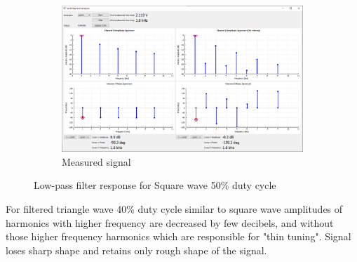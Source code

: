 \documentclass[notitlepage, a4paper, 11pt]{article}
\begin{document}
\begin{figure}[H]
\begin{subfigure}[][][t]{0.45\textwidth}
			\includegraphics[width=\textwidth, trim=10 80 10 100, clip]{../img/Circuit1/dut50}
			\caption{Measured signal}
		\end{subfigure}
		\caption{Low-pass filter response for Square wave 50\% duty cycle}
	\end{figure}
	
	\newpage
	
	For filtered triangle wave 40\% duty cycle similar to square wave amplitudes of harmonics with higher frequency are decreased by few decibels, and without those higher frequency harmonics which are responsible for "thin tuning". Signal loses sharp shape and retains only rough shape of the signal.
	
\end{document}
